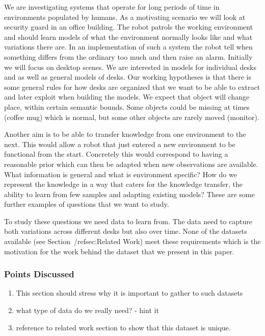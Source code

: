 \documentclass[letterpaper, 10 pt, conference]{ieeeconf}  %
\begin{document}
We are investigating systems that operate for long periods of time in environments populated by humans. 
As a motivating scenario we will look at security guard in an office building. The robot patrols the working environment and should learn 
models of what the environment normally looks like and what variations there are. In an implementation of such a system the robot tell when 
something differs from the ordinary too much and then raise an alarm. Initially we will focus on desktop scenes. We are interested in models 
for individual desks and as well as general models of desks. Our working hypotheses is that there is some general rules for how desks are 
organized that we want to be able to extract and later exploit when building the models. We expect that object will change place, within certain semantic bounds. Some objects could be missing at times (coffee mug) which is normal, but some other objects are rarely moved (monitor).

Another aim is to be able to transfer knowledge from one environment to the next. This would allow a robot that just entered a new 
environment to be functional from the start. Concretely this would correspond to having a reasonable prior which can then be adapted when 
new observations are available. What information is general and what is environment specific? How do we represent the knowledge in a way that caters for the knowledge transfer, the ability to learn from few samples and adapting existing models? These are some further examples of questions that we want to study.

To study these questions we need data to learn from. The data need to capture both variations across different desks but also over time. None of the datasets available (see Section~/ref{sec:Related Work}) meet these requirements which is the motivation for the work behind the dataset that we present in this paper.

\subsubsection*{Points Discussed}
\begin{enumerate}
	\item This section should stress why it is important to gather to such datasets
	\item what type of data do we really need? - hint it
	\item reference to related work section to show that this dataset is unique.
\end{enumerate}
\end{document}
